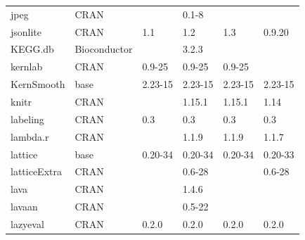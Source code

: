 \begin{longtable}{llllll}
\rowcolor{black!5}
jpeg                          & \acrshort{CRAN}                      &             & 0.1-8       &                &                    \\
\rowcolor{black!10}
jsonlite                      & \acrshort{CRAN}                      & 1.1         & 1.2         & 1.3            & 0.9.20            \\
\rowcolor{black!5}
KEGG.db                       & Bioconductor              &             & 3.2.3       &                &                    \\
\rowcolor{black!10}
kernlab                       & \acrshort{CRAN}                      & 0.9-25      & 0.9-25      & 0.9-25         &                   \\
\rowcolor{black!5}
KernSmooth                    & base                      & 2.23-15     & 2.23-15     & 2.23-15        & 2.23-15            \\
\rowcolor{black!10}
knitr                         & \acrshort{CRAN}                      &             & 1.15.1      & 1.15.1         & 1.14              \\
\rowcolor{black!5}
labeling                      & \acrshort{CRAN}                      & 0.3         & 0.3         & 0.3            & 0.3                \\
\rowcolor{black!10}
lambda.r                      & \acrshort{CRAN}                      &             & 1.1.9       & 1.1.9          & 1.1.7             \\
\rowcolor{black!5}
lattice                       & base                      & 0.20-34     & 0.20-34     & 0.20-34        & 0.20-33            \\
\rowcolor{black!10}
latticeExtra                  & \acrshort{CRAN}                      &             & 0.6-28      &                & 0.6-28            \\
\rowcolor{black!5}
lava                          & \acrshort{CRAN}                      &             & 1.4.6       &                &                    \\
\rowcolor{black!10}
lavaan                        & \acrshort{CRAN}                      &             & 0.5-22      &                &                   \\
\rowcolor{black!5}
lazyeval                      & \acrshort{CRAN}                      & 0.2.0       & 0.2.0       & 0.2.0          & 0.2.0              \\

\end{longtable}

